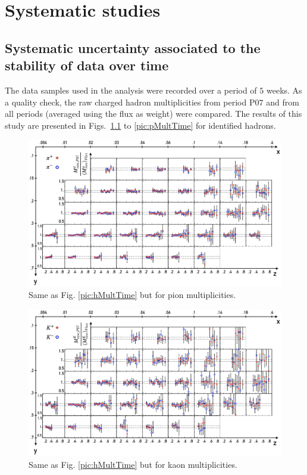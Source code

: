
\chapter{Systematic studies}\label{app:Sys}


\section{Systematic uncertainty associated to the stability of data over time}

The data samples used in the analysis were recorded over a period of $5$ weeks. As a quality check, the raw charged hadron multiplicities from period P$07$ and from all periods (averaged using the flux as weight) were compared. The results of this study are presented in Figs.~\ref{pic:piMultTime} to \ref{pic:pMultTime} for identified hadrons.

\newpage

\begin{figure}
  \centering
	\includegraphics[scale=0.7]{./gfx/SysTimeMultpi.png}
	\caption{Same as Fig. \ref{pic:hMultTime} but for pion multiplicities.}
	\label{pic:piMultTime}
\end{figure}

\begin{figure}
  \centering
	\includegraphics[scale=0.7]{./gfx/SysTimeMultk.png}
	\caption{Same as Fig. \ref{pic:hMultTime} but for kaon multiplicities.}
	\label{pic:kMultTime}
\end{figure}

